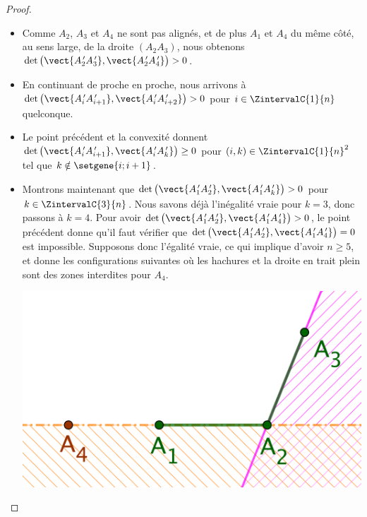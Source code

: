 \begin{proof}
\begin{itemize}
		\item Comme $A_2$, $A_3$ et $A_4$ ne sont pas alignés, et de plus $A_1$ et $A_4$ du même côté, au sens large, de la droite $(A_2 A_3)$, nous obtenons
		$\det \big( \vect{A^{\,\prime}_2 A^{\,\prime}_3}, \vect{A^{\,\prime}_2 A^{\,\prime}_4} \big) > 0$.


		\item En continuant de proche en proche, nous arrivons à
		$\det \big( \vect{A^{\,\prime}_i A^{\,\prime}_{i+1}}, \vect{A^{\,\prime}_i A^{\,\prime}_{i+2}} \big) > 0$
		pour $i \in \ZintervalC{1}{n}$ quelconque.


		\item Le point précédent et la convexité donnent
		$\det \big( \vect{A^{\,\prime}_i A^{\,\prime}_{i+1}}, \vect{A^{\,\prime}_i A^{\,\prime}_k} \big) \geq 0$
		pour $(i, k) \in \ZintervalC{1}{n}^2$ tel que $k \notin \setgene{i ; i+1}$.


		\item
		Montrons maintenant que
		$\det \big( \vect{A^{\,\prime}_1 A^{\,\prime}_2}, \vect{A^{\,\prime}_1 A^{\,\prime}_k} \big) > 0$
		pour $k \in \ZintervalC{3}{n}$.
		Nous savons déjà l'inégalité vraie pour $k = 3$, donc passons à $k = 4$.
		Pour avoir 
		$\det \big( \vect{A^{\,\prime}_1 A^{\,\prime}_2}, \vect{A^{\,\prime}_1 A^{\,\prime}_4} \big) > 0$, 
		le point précédent donne qu'il faut vérifier que 
		$\det \big( \vect{A^{\,\prime}_1 A^{\,\prime}_2}, \vect{A^{\,\prime}_1 A^{\,\prime}_4} \big) = 0$
		est impossible.
		Supposons donc l'égalité vraie, ce qui implique d'avoir $n \geq 5$, et donne les configurations suivantes où les hachures et la droite en trait plein sont des zones interdites pour $A_4$.

        \begin{multicols}{2}
            \small\itshape\centering
           	\includegraphics[scale=.4]{content/polygon/at-least-one/conv-det-A4-1.png}
        	    

\end{multicols}
\end{itemize}
\end{proof}
